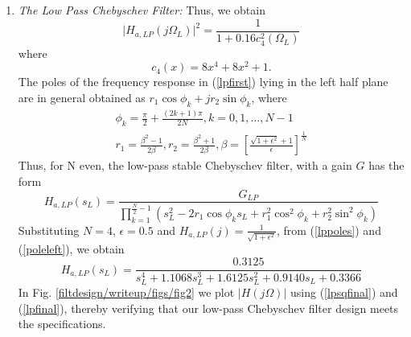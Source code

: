 \documentclass{article}
\begin{document}
\begin{enumerate}

\item {\em The Low Pass Chebyschev Filter:} Thus, we obtain
\begin{equation}
\label{lpsqfinal}
\vert H_{a,LP}(j\Omega_L)\vert^2 = \frac{1}{1 + 0.16c_4^2(\Omega_L)}
\end{equation}
where
\begin{equation}
c_4(x) = 8x^4 + 8x^2 + 1.	
\end{equation}
The poles of the frequency response in (\ref{lpfirst}) lying in the left half plane are in general obtained as 
$r_1\cos\phi_k + jr_2\sin \phi_k$, where
\begin{eqnarray}
\label{lppoles}
\phi_k = \frac{\pi}{2} + \frac{(2k+1)\pi}{2N}, k = 0, 1, \dots, N-1 \nonumber \\
r_1 = \frac{\beta^2 - 1}{2\beta}, r_2 = \frac{\beta^2 + 1}{2\beta}, \beta = \left[ \frac{\sqrt{1 + \epsilon^2} + 1}{\epsilon}\right]^{\frac{1}{N}}
\end{eqnarray}
Thus, for N even, the low-pass stable Chebyschev filter, with a gain $G$ has the form
\begin{equation}
\label{poleleft}
H_{a,LP}(s_L) = \frac{G_{LP}}{\prod_{k = 1}^{\frac{N}{2}-1}(s_L^2 - 2r_1\cos\phi_ks_L + r_1^2\cos^2\phi_k + r_2^2 \sin^2\phi_k)}
\end{equation}
Substituting $N = 4$, $\epsilon = 0.5$ and $H_{a,LP}(j) = \frac{1}{\sqrt{1+\epsilon^2}}$, from (\ref{lppoles}) and (\ref{poleleft}), we obtain 
\begin{equation}
\label{lpfinal}
H_{a,LP}(s_L) = \frac{0.3125}{s_L^4 + 1.1068s_L^3 + 1.6125s_L^2+0.9140s_L + 0.3366}
\end{equation}
In Fig. \ref{filtdesign/writeup/figs/fig2} we plot $|H(j\Omega)|$ using (\ref{lpsqfinal}) and (\ref{lpfinal}), thereby verifying that our low-pass Chebyschev filter design meets the specifications.
	

\end{enumerate}
\end{document}
